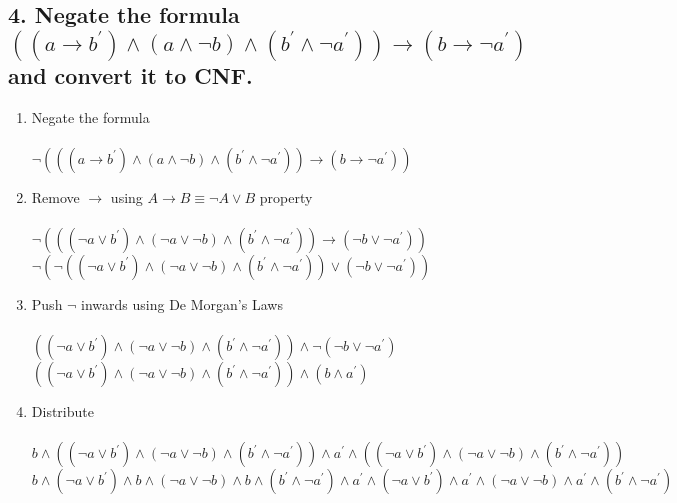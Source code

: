 \documentclass[a4paper, 14pt]{report}
\newcommand{\question}[1]{\subsection*{#1}}
\begin{document}
\question{4. Negate the formula $ ((a \rightarrow b^\prime) \wedge (a \wedge \neg b) \wedge (b^\prime \wedge \neg a^\prime)) \rightarrow (b \rightarrow \neg a^\prime) $  and convert it to CNF.} %

\begin{enumerate}

	\begin{enumerate}

		\item Negate the formula \\ \\
			$ \neg (((a \rightarrow b^\prime) \wedge (a \wedge \neg b) \wedge (b^\prime \wedge \neg a^\prime)) \rightarrow (b \rightarrow \neg a^\prime)) $
		
		\item Remove $\rightarrow$ using $A \rightarrow B \equiv \neg A \vee B$ property \\ \\
			$ \neg (((\neg a \vee b^\prime) \wedge (\neg a \vee \neg b) \wedge (b^\prime \wedge \neg a^\prime)) \rightarrow (\neg b \vee \neg a^\prime)) $ \\
			$ \neg (\neg ((\neg a \vee b^\prime) \wedge (\neg a \vee \neg b) \wedge (b^\prime \wedge \neg a^\prime)) \vee (\neg b \vee \neg a^\prime)) $ \\

		\item Push $\neg$ inwards using De Morgan's Laws \\ \\
			$ ((\neg a \vee b^\prime) \wedge (\neg a \vee \neg b) \wedge (b^\prime \wedge \neg a^\prime)) \wedge \neg (\neg b \vee \neg a^\prime) $ \\
			$ ((\neg a \vee b^\prime) \wedge (\neg a \vee \neg b) \wedge (b^\prime \wedge \neg a^\prime)) \wedge (b \wedge a^\prime) $ \\

		\item Distribute \\ \\ 
			$ b \wedge ((\neg a \vee b^\prime) \wedge (\neg a \vee \neg b) \wedge (b^\prime \wedge \neg a^\prime)) \wedge a^\prime \wedge  ((\neg a \vee b^\prime) \wedge (\neg a \vee \neg b) \wedge (b^\prime \wedge \neg a^\prime)) $ \\
			$ b \wedge (\neg a \vee b^\prime) \wedge b \wedge (\neg a \vee \neg b) \wedge b \wedge (b^\prime \wedge \neg a^\prime) \wedge a^\prime \wedge (\neg a \vee b^\prime) \wedge a^\prime \wedge (\neg a \vee \neg b) \wedge a^\prime \wedge (b^\prime \wedge \neg a^\prime) $


\end{enumerate}
\end{enumerate}
\end{document}
